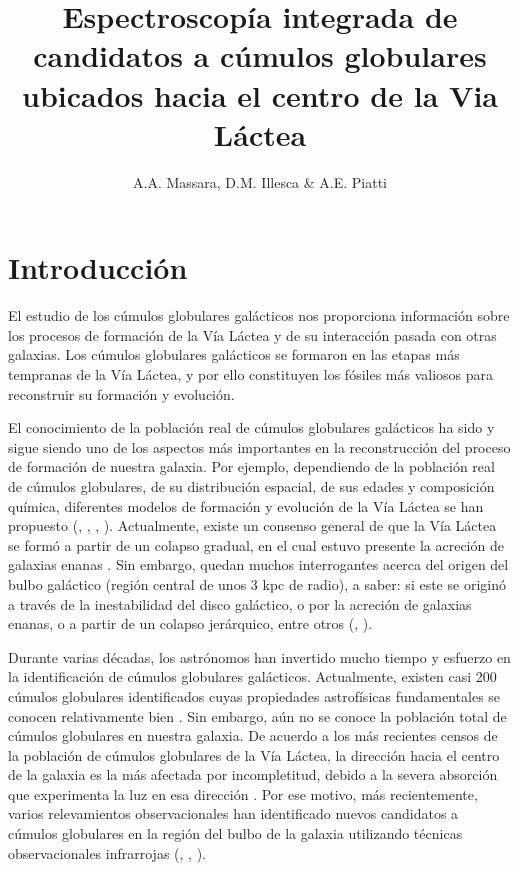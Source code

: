\documentclass[baaa]{baaa}
\title{Espectroscopía integrada de candidatos a cúmulos globulares ubicados hacia el centro de la Via Láctea
}
\author{A.A. Massara\inst{1}, D.M. Illesca\inst{1,2} \& A.E. Piatti\inst{1,2}
}
\institute{
Facultad de Ciencias Exactas y Naturales, UNCuyo, Argentina
\and
Instituto Interdisciplinario de Ciencias Básicas, CONICET--UNCuyo, Argentina
}
\begin{document}
\maketitle
\section{Introducción}\label{S_intro}

 El estudio de los cúmulos globulares galácticos nos proporciona información sobre los procesos de formación de la Vía Láctea y de su interacción pasada con otras galaxias. Los cúmulos globulares galácticos se formaron en las etapas más tempranas de la Vía Láctea, y por ello constituyen los fósiles más valiosos para reconstruir su formación y evolución.

El conocimiento de la población real de cúmulos globulares galácticos ha sido y sigue siendo uno de los aspectos más importantes en la reconstrucción del proceso de formación de nuestra galaxia. Por ejemplo, dependiendo de la población real de cúmulos globulares, de su distribución espacial, de sus edades y composición química, diferentes modelos de formación y evolución de la Vía Láctea se han propuesto (\citealt{prantzos-1998}, \citealt{gilmore-1999}, \citealt{jang-2015}, \citealt{keller-2020}). Actualmente, existe un consenso general de que la Vía Láctea se formó a partir de un colapso gradual, en el cual estuvo presente la acreción de galaxias enanas \citep{kruijssen-2019}. Sin embargo, quedan muchos interrogantes acerca del origen del bulbo galáctico (región central de unos 3 kpc de radio), a saber: si este se originó a través de la inestabilidad del disco galáctico, o por la acreción de galaxias enanas, o a partir de un colapso jerárquico, entre otros (\cite{debattista-2019}, \cite{lian-2021}).

Durante varias décadas, los astrónomos han invertido mucho tiempo y esfuerzo en la identificación de cúmulos globulares galácticos. Actualmente, existen casi 200 cúmulos globulares identificados cuyas propiedades astrofísicas fundamentales se conocen relativamente bien \citep{baumgardt-2019}. Sin embargo, aún no se conoce la población total de cúmulos globulares en nuestra galaxia. De acuerdo a los más recientes censos de la población de cúmulos globulares de la Vía Láctea, la dirección hacia el centro de la galaxia es la más afectada por incompletitud, debido a la severa absorción que experimenta la luz en esa dirección \citep{harris-1996}. Por ese motivo, más recientemente, varios relevamientos observacionales han identificado nuevos candidatos a cúmulos globulares en la región del bulbo de la galaxia utilizando técnicas observacionales infrarrojas (\cite{froebrich-2008}, \cite{minniti-2017}, \cite{camargo-2018}).
\end{document}
